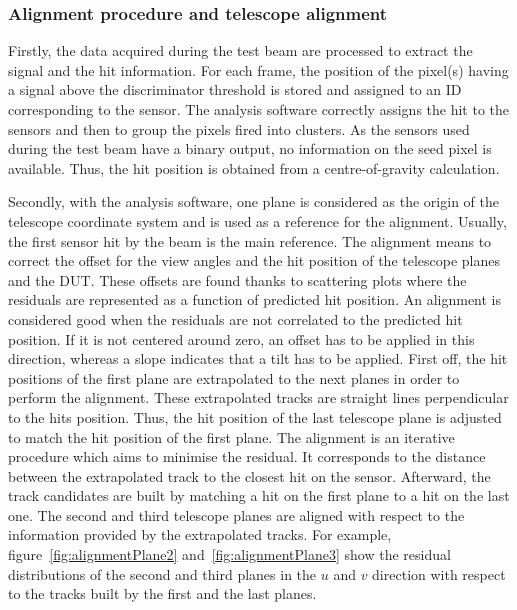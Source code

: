       \subsubsection{Alignment procedure and telescope alignment}

      Firstly, the data acquired during the test beam are processed to extract the signal and the hit information.
      For each frame, the position of the pixel(s) having a signal above the discriminator threshold is stored and assigned to an ID corresponding to the sensor.
      The analysis software correctly assigns the hit to the sensors and then to group the pixels fired into clusters.
      As the sensors used during the test beam have a binary output, no information on the seed pixel is available.
      Thus, the hit position is obtained from a centre-of-gravity calculation.

      Secondly, with the analysis software, one plane is considered as the origin of the telescope coordinate system and is used as a reference for the alignment.
      Usually, the first sensor hit by the beam is the main reference.
      The alignment means to correct the offset for the view angles and the hit position of the telescope planes and the \gls{DUT}.
      These offsets are found thanks to scattering plots where the residuals are represented as a function of predicted hit position.
      An alignment is considered good when the residuals are not correlated to the predicted hit position.
      If it is not centered around zero, an offset has to be applied in this direction, whereas a slope indicates that a tilt has to be applied.
      First off, the hit positions of the first plane are extrapolated to the next planes in order to perform the alignment.
      These extrapolated tracks are straight lines perpendicular to the hits position.
      Thus, the hit position of the last telescope plane is adjusted to match the hit position of the first plane.
      The alignment is an iterative procedure which aims to minimise the residual. 
      It corresponds to the distance between the extrapolated track to the closest hit on the sensor.
      Afterward, the track candidates are built by matching a hit on the first plane to a hit on the last one.
      The second and third telescope planes are aligned with respect to the information provided by the extrapolated tracks.
      For example, figure~\ref{fig:alignmentPlane2} and~\ref{fig:alignmentPlane3} show the residual distributions of the second and third planes in the $u$ and $v$ direction with respect to the tracks built by the first and the last planes.

